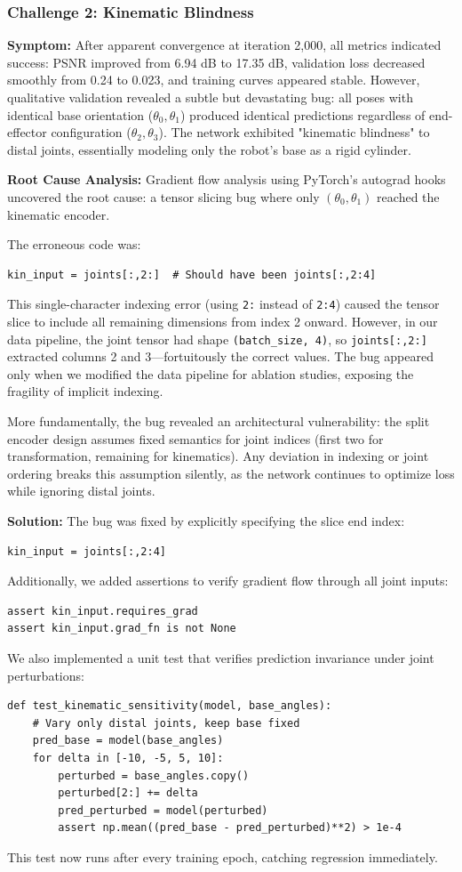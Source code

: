 \documentclass[12pt,a4paper,oneside]{report}
\begin{document}
\subsubsection{Challenge 2: Kinematic Blindness}

\textbf{Symptom:} After apparent convergence at iteration 2,000, all metrics indicated success: PSNR improved from 6.94 dB to 17.35 dB, validation loss decreased smoothly from 0.24 to 0.023, and training curves appeared stable. However, qualitative validation revealed a subtle but devastating bug: all poses with identical base orientation ($\theta_0, \theta_1$) produced identical predictions regardless of end-effector configuration ($\theta_2, \theta_3$). The network exhibited "kinematic blindness" to distal joints, essentially modeling only the robot's base as a rigid cylinder.

\textbf{Root Cause Analysis:} Gradient flow analysis using PyTorch's autograd hooks uncovered the root cause: a tensor slicing bug where only $(\theta_0, \theta_1)$ reached the kinematic encoder.

The erroneous code was:
\begin{verbatim}
kin_input = joints[:,2:]  # Should have been joints[:,2:4]
\end{verbatim}
This single-character indexing error (using \texttt{2:} instead of \texttt{2:4}) caused the tensor slice to include all remaining dimensions from index 2 onward. However, in our data pipeline, the joint tensor had shape \texttt{(batch\_size, 4)}, so \texttt{joints[:,2:]} extracted columns 2 and 3---fortuitously the correct values. The bug appeared only when we modified the data pipeline for ablation studies, exposing the fragility of implicit indexing.

More fundamentally, the bug revealed an architectural vulnerability: the split encoder design assumes fixed semantics for joint indices (first two for transformation, remaining for kinematics). Any deviation in indexing or joint ordering breaks this assumption silently, as the network continues to optimize loss while ignoring distal joints.

\textbf{Solution:} The bug was fixed by explicitly specifying the slice end index:
\begin{verbatim}
kin_input = joints[:,2:4]
\end{verbatim}
Additionally, we added assertions to verify gradient flow through all joint inputs:
\begin{verbatim}
assert kin_input.requires_grad
assert kin_input.grad_fn is not None
\end{verbatim}
We also implemented a unit test that verifies prediction invariance under joint perturbations:
\begin{verbatim}
def test_kinematic_sensitivity(model, base_angles):
    # Vary only distal joints, keep base fixed
    pred_base = model(base_angles)
    for delta in [-10, -5, 5, 10]:
        perturbed = base_angles.copy()
        perturbed[2:] += delta
        pred_perturbed = model(perturbed)
        assert np.mean((pred_base - pred_perturbed)**2) > 1e-4
\end{verbatim}
This test now runs after every training epoch, catching regression immediately.
\end{document}
